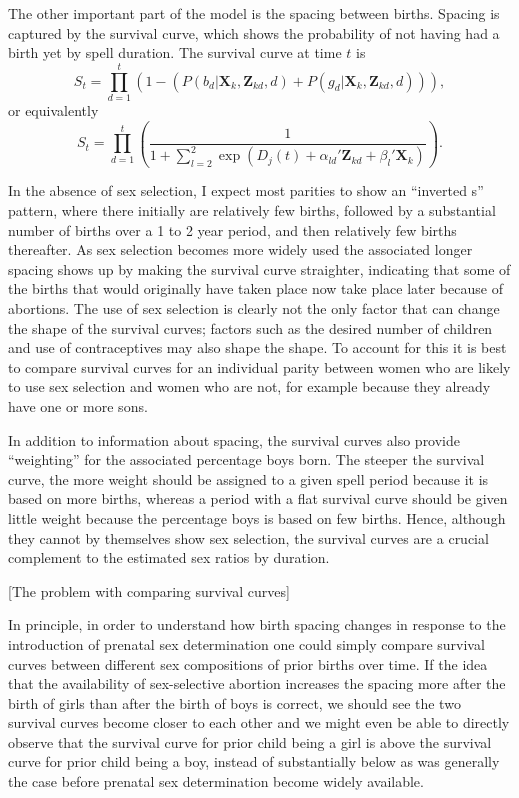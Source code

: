\documentclass[12pt,letterpaper]{article}
\begin{document}
The other important part of the model is the spacing between births.
Spacing is captured by the survival curve, which shows the probability of not 
having had a birth yet by spell duration.
The survival curve at time $t$ is 
\begin{equation}
S_{t} 
= 
\prod_{d=1}^t 
\left( 
	1- \left(P(b_{d} | \mathbf{X}_{k}, \mathbf{Z}_{kd}, d) 
	+ P(g_{d} | \mathbf{X}_{k}, \mathbf{Z}_{kd}, d) \right) 
\right),
 \label{eq:survival}
\end{equation}
or equivalently
\begin{equation}
S_{t} 
= 
\prod_{d=1}^t
\left(
\frac{ 1 }
{1 + \sum_{l=2}^2 \exp(D_j(t) + \alpha_{ld}'\mathbf{Z}_{kd} + \beta_l'\mathbf{X}_{k})}
\right).
\end{equation}

In the absence of sex selection, I expect most parities to show an 
``inverted s'' pattern, where there initially are relatively few births, 
followed by a substantial number of births over a 1 to 2 year period, and then
relatively few births thereafter.
As sex selection becomes more widely used the associated
longer spacing shows up by making the survival curve straighter,
indicating that some of the births that would originally have taken place
now take place later because of abortions.
The use of sex selection is clearly not the only factor that can change the shape of
the survival curves; factors such as the desired number of children and
use of contraceptives may also shape the shape.
To account for this it is best to compare survival curves for an individual
parity between women who are likely to use sex selection and women who are
not, for example because they already have one or more sons.

In addition to information about spacing, the survival curves also provide 
``weighting'' for the associated percentage boys born.
The steeper the survival curve, the more weight should be assigned to a given
spell period because it is based on more births, 
whereas a period with a flat survival curve should be given little weight because the 
percentage boys is based on few births.
Hence, although they cannot by themselves show sex selection, the survival
curves are a crucial complement to the estimated sex ratios by duration.


[The problem with comparing survival curves]

In principle, in order to understand how birth spacing changes in response
to the introduction of prenatal sex determination one could simply compare survival 
curves between different sex compositions of prior births over time.
If the idea that the availability of sex-selective abortion increases the
spacing more after the birth of girls than after the birth of boys is 
correct, we should see the two survival curves become closer to each other
and we might even be able to directly observe that the survival curve for prior
child being a girl is above the survival curve for prior child being a boy,
instead of substantially below as was generally the case before prenatal
sex determination become widely available.
\end{document}
